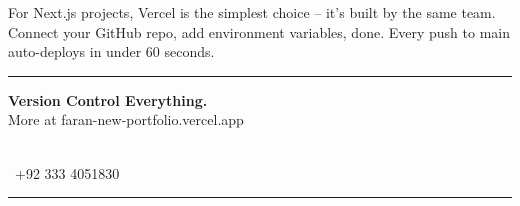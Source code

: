 \documentclass[12pt,a4paper]{article}
\begin{document}
\begin{tipbox}
For Next.js projects, Vercel is the simplest choice -- it's built by the same team. Connect your GitHub repo, add environment variables, done. Every push to main auto-deploys in under 60 seconds.
\end{tipbox}

\newpage
\pagecolor{FaranDark}\color{white}\centering\vspace*{4cm}
{\color{FaranRed}\rule{\textwidth}{3pt}}\vspace{1cm}
{\fontsize{28}{36}\selectfont\textbf{Version Control Everything.}}\\[0.5cm]
{\large More at \textcolor{FaranRed}{faran-new-portfolio.vercel.app}}
\vspace{2cm}
\begin{tcolorbox}[colback=FaranRed, colframe=FaranRed, width=0.7\textwidth, arc=10pt, boxrule=0pt, halign=center]
\centering{}\\\faWhatsapp~+92 333 4051830
\end{tcolorbox}
{\color{FaranRed}\rule{\textwidth}{3pt}}
\end{document}
